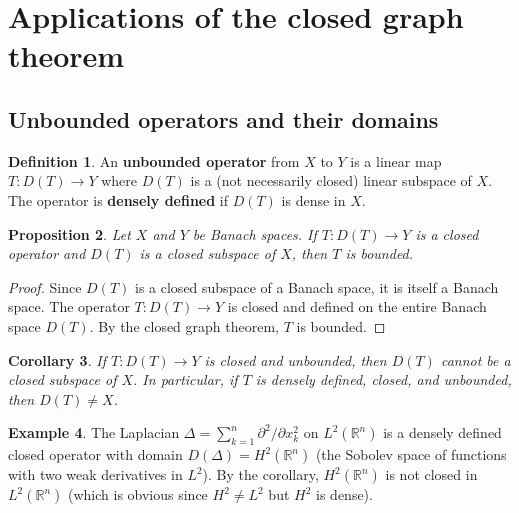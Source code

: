 \documentclass[a4paper,12pt]{book}
\newcommand{\R}{\mathbb{R}}
\theoremstyle{definition}
\newtheorem{definition}{Definition}[chapter]
\newtheorem{example}[definition]{Example}
\theoremstyle{plain}
\newtheorem{proposition}[definition]{Proposition}
\newtheorem{corollary}[definition]{Corollary}
\theoremstyle{remark}
\begin{document}
\section{Applications of the closed graph theorem}\label{sec:cgt-applications}

\subsection{Unbounded operators and their domains}\label{subsec:unbounded-ops}

\begin{definition}\label{def:unbounded-operator}
An \textbf{unbounded operator} from $X$ to $Y$ is a linear map
$T \colon D(T) \to Y$ where $D(T)$ is a (not necessarily closed) linear subspace
of $X$. The operator is \textbf{densely defined}
if $D(T)$ is dense in $X$.
\end{definition}

\begin{proposition}\label{prop:closed-bounded-domain}
Let $X$ and $Y$ be Banach spaces. If $T \colon D(T) \to Y$ is a closed operator
and $D(T)$ is a closed subspace of $X$, then $T$ is bounded.
\end{proposition}

\begin{proof}
Since $D(T)$ is a closed subspace of a Banach space, it is itself a Banach space.
The operator $T \colon D(T) \to Y$ is closed and defined on the entire Banach space
$D(T)$. By the closed graph theorem, $T$ is bounded.
\end{proof}

\begin{corollary}\label{cor:unbounded-closed-not-everywhere}
If $T \colon D(T) \to Y$ is closed and unbounded, then $D(T)$ cannot be a closed
subspace of $X$. In particular, if $T$ is densely defined, closed, and unbounded,
then $D(T) \neq X$.
\end{corollary}

\begin{example}\label{ex:unbounded-laplacian}
The Laplacian $\Delta = \sum_{k=1}^n \partial^2/\partial x_k^2$ on $L^2(\R^n)$
is a densely defined closed operator with domain
$D(\Delta) = H^2(\R^n)$ (the Sobolev space of functions with
two weak derivatives in $L^2$). By the corollary, $H^2(\R^n)$ is not closed in
$L^2(\R^n)$ (which is obvious since $H^2 \neq L^2$ but $H^2$ is dense).
\end{example}
\end{document}

